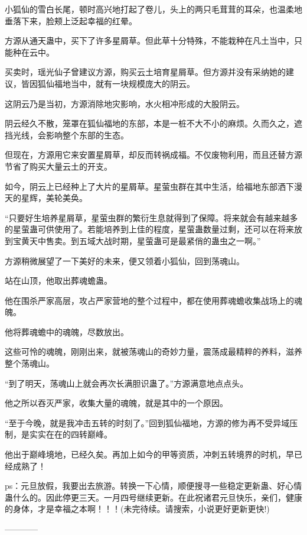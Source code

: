 \begin{this_body}
小狐仙的雪白长尾，顿时高兴地打起了卷儿，头上的两只毛茸茸的耳朵，也温柔地垂落下来，脸颊上泛起幸福的红晕。

方源从通天蛊中，买下了许多星屑草。但此草十分特殊，不能栽种在凡土当中，只能种在云中。

买卖时，瑶光仙子曾建议方源，购买云土培育星屑草。但方源并没有采纳她的建议，皆因狐仙福地当中，就有一块规模庞大的阴云。

这阴云乃是当初，方源消除地灾影响，水火相冲形成的大股阴云。

阴云经久不散，笼罩在狐仙福地的东部，本是一桩不大不小的麻烦。久而久之，遮挡光线，会影响整个东部的生态。

但现在，方源用它来安置星屑草，却反而转祸成福。不仅废物利用，而且还替方源节省了购买大量云土的开支。

如今，阴云上已经种上了大片的星屑草。星萤虫群在其中生活，给福地东部洒下漫天的星辉，美轮美奂。

“只要好生培养星屑草，星萤虫群的繁衍生息就得到了保障。将来就会有越来越多的星萤蛊可供使用了。若能培养到上佳的程度，星萤蛊数量过剩，还可以在将来放到宝黄天中售卖。到五域大战时期，星萤蛊可是最紧俏的蛊虫之一啊。”

方源稍微展望了一下美好的未来，便又领着小狐仙，回到荡魂山。

站在山顶，他取出葬魂蟾蛊。

他在围杀严家高层，攻占严家营地的整个过程中，都在使用葬魂蟾收集战场上的魂魄。

他将葬魂蟾中的魂魄，尽数放出。

这些可怜的魂魄，刚刚出来，就被荡魂山的奇妙力量，震荡成最精粹的养料，滋养整个荡魂山。

“到了明天，荡魂山上就会再次长满胆识蛊了。”方源满意地点点头。

他之所以吞灭严家，收集大量的魂魄，就是其中的一个原因。

“至于今晚，就是我冲击五转的时刻了。”回到狐仙福地，方源的修为再不受异域压制，是实实在在的四转巅峰。

他出于巅峰境地，已经久矣。再加上如今的甲等资质，冲刺五转境界的时机，早已经成熟了！

ps：元旦放假，我要出去旅游。转换一下心情，顺便搜寻一些稳定更新蛊、好心情蛊什么的。因此停更三天。一月四号继续更新。在此祝诸君元旦快乐，亲们，健康的身体，才是幸福之本啊！！！(未完待续。请搜索，小说更好更新更快!)

------------

\end{this_body}

